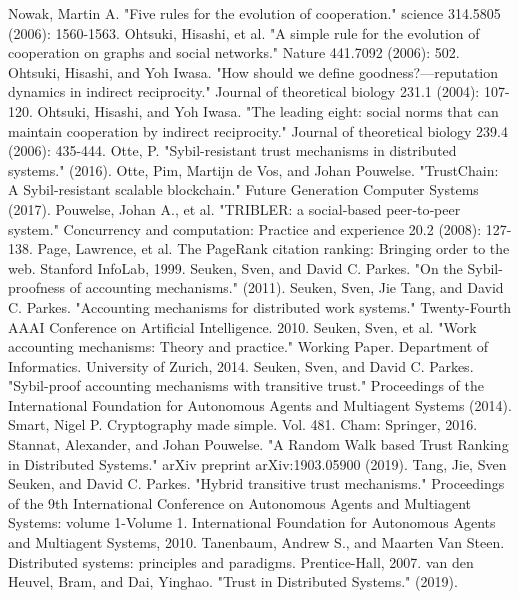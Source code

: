 \documentclass[whitelogo]{tudelft-report}
\theoremstyle{definition}
\theoremstyle{theorem}
\theoremstyle{proposition}
\theoremstyle{corollary}
\theoremstyle{lemma}
\theoremstyle{example}
\theoremstyle{remark}
\begin{document}
\begin{thebibliography}{9}
Nowak, Martin A. "Five rules for the evolution of cooperation." science 314.5805 (2006): 1560-1563.
Ohtsuki, Hisashi, et al. "A simple rule for the evolution of cooperation on graphs and social networks." Nature 441.7092 (2006): 502.
Ohtsuki, Hisashi, and Yoh Iwasa. "How should we define goodness?—reputation dynamics in indirect reciprocity." Journal of theoretical biology 231.1 (2004): 107-120.
Ohtsuki, Hisashi, and Yoh Iwasa. "The leading eight: social norms that can maintain cooperation by indirect reciprocity." Journal of theoretical biology 239.4 (2006): 435-444.
Otte, P. "Sybil-resistant trust mechanisms in distributed systems." (2016).
Otte, Pim, Martijn de Vos, and Johan Pouwelse. "TrustChain: A Sybil-resistant scalable blockchain." Future Generation Computer Systems (2017).
Pouwelse, Johan A., et al. "TRIBLER: a social‐based peer‐to‐peer system." Concurrency and computation: Practice and experience 20.2 (2008): 127-138.
Page, Lawrence, et al. The PageRank citation ranking: Bringing order to the web. Stanford InfoLab, 1999. 
Seuken, Sven, and David C. Parkes. "On the Sybil-proofness of accounting mechanisms." (2011).
Seuken, Sven, Jie Tang, and David C. Parkes. "Accounting mechanisms for distributed work systems." Twenty-Fourth AAAI Conference on Artificial Intelligence. 2010.
Seuken, Sven, et al. "Work accounting mechanisms: Theory and practice." Working Paper. Department of Informatics. University of Zurich, 2014.
Seuken, Sven, and David C. Parkes. "Sybil-proof accounting mechanisms with transitive trust." Proceedings of the International Foundation for Autonomous Agents and Multiagent Systems (2014).
Smart, Nigel P. Cryptography made simple. Vol. 481. Cham: Springer, 2016.
Stannat, Alexander, and Johan Pouwelse. "A Random Walk based Trust Ranking in Distributed Systems." arXiv preprint arXiv:1903.05900 (2019).
Tang, Jie, Sven Seuken, and David C. Parkes. "Hybrid transitive trust mechanisms." Proceedings of the 9th International Conference on Autonomous Agents and Multiagent Systems: volume 1-Volume 1. International Foundation for Autonomous Agents and Multiagent Systems, 2010.
Tanenbaum, Andrew S., and Maarten Van Steen. Distributed systems: principles and paradigms. Prentice-Hall, 2007.
van den Heuvel, Bram, and Dai, Yinghao. "Trust in Distributed Systems." (2019).  



\end{thebibliography}
\end{document}
